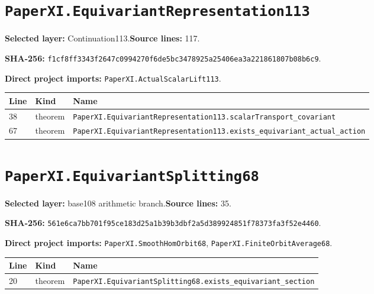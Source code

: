 \documentclass[10pt,oneside]{book}
\begin{document}
\section{\texorpdfstring{\nolinkurl{PaperXI.EquivariantRepresentation113}}{PaperXI.EquivariantRepresentation113}}\label{module:PaperXI.EquivariantRepresentation113}

\textbf{Selected layer:} Continuation113.\quad\textbf{Source lines:} 117.\par\textbf{SHA-256:} {\scriptsize\nolinkurl{f1cf8ff3343f2647c0994270f6de5bc3478925a25406ea3a221861807b08b6c9}}.


\textbf{Direct project imports:} \nolinkurl{PaperXI.ActualScalarLift113}.

\begin{longtable}{@{}p{}p{}p{}@{}}\toprule Line&Kind&Name\\\midrule\endhead

38&theorem&\nolinkurl{PaperXI.EquivariantRepresentation113.scalarTransport_covariant}\\

67&theorem&\nolinkurl{PaperXI.EquivariantRepresentation113.exists_equivariant_actual_action}\\

\bottomrule\end{longtable}

\section{\texorpdfstring{\nolinkurl{PaperXI.EquivariantSplitting68}}{PaperXI.EquivariantSplitting68}}\label{module:PaperXI.EquivariantSplitting68}

\textbf{Selected layer:} base108 arithmetic branch.\quad\textbf{Source lines:} 35.\par\textbf{SHA-256:} {\scriptsize\nolinkurl{561e6ca7bb701f95ce183d25a1b39b3dbf2a5d389924851f78373fa3f52e4460}}.


\textbf{Direct project imports:} \nolinkurl{PaperXI.SmoothHomOrbit68}, \nolinkurl{PaperXI.FiniteOrbitAverage68}.

\begin{longtable}{@{}p{}p{}p{}@{}}\toprule Line&Kind&Name\\\midrule\endhead

20&theorem&\nolinkurl{PaperXI.EquivariantSplitting68.exists_equivariant_section}\\

\bottomrule\end{longtable}
\end{document}
